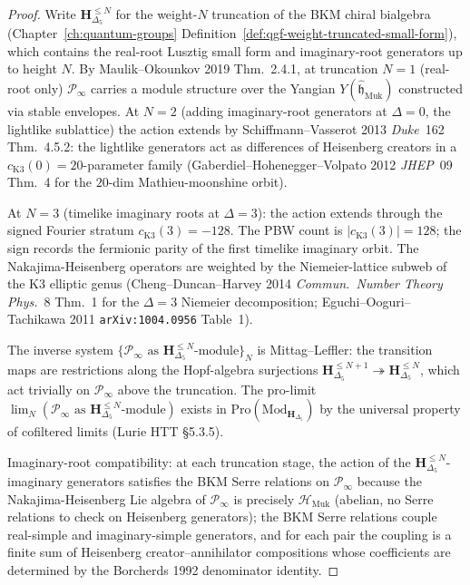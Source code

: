 \begin{proof}
Write $\mathbf H_{\Delta_5}^{\leq N}$ for the weight-$N$ truncation
of the BKM chiral bialgebra
(Chapter~\ref{ch:quantum-groups}
Definition~\ref{def:qgf-weight-truncated-small-form}), which
contains the real-root Lusztig small form and imaginary-root
generators up to height $N$. By Maulik--Okounkov 2019 Thm.~2.4.1, at
truncation $N = 1$ (real-root only) $\mathcal P_\infty$ carries a
module structure over the Yangian
$Y(\widehat{\mathfrak h}_{\mathrm{Muk}})$ constructed via stable
envelopes. At $N = 2$ (adding imaginary-root generators at $\Delta = 0$,
the lightlike sublattice) the action extends by
Schiffmann--Vasserot 2013 \emph{Duke}~162 Thm.~4.5.2: the lightlike
generators act as differences of Heisenberg creators in a
$c_{\mathrm{K3}}(0) = 20$-parameter family
(Gaberdiel--Hohenegger--Volpato 2012 \emph{JHEP}~09 Thm.~4 for the
$20$-dim Mathieu-moonshine orbit).

At $N = 3$ (timelike imaginary roots at $\Delta = 3$): the action
extends through the signed Fourier stratum
$c_{\mathrm{K3}}(3)=-128$.  The PBW count is $|c_{\mathrm{K3}}(3)|=128$;
the sign records the fermionic parity of the first timelike imaginary
orbit.  The Nakajima-Heisenberg operators are weighted by the
Niemeier-lattice subweb of the K3 elliptic genus
(Cheng--Duncan--Harvey 2014 \emph{Commun.\ Number Theory Phys.}~8
Thm.~1 for the $\Delta = 3$ Niemeier decomposition; Eguchi--Ooguri--
Tachikawa 2011 \texttt{arXiv:1004.0956} Table~1).

The inverse system $\{\mathcal P_\infty \text{ as } \mathbf H_{\Delta_5}^{\leq N}
\text{-module}\}_N$ is Mittag--Leffler: the transition maps are
restrictions along the Hopf-algebra surjections
$\mathbf H_{\Delta_5}^{\leq N+1}\twoheadrightarrow
\mathbf H_{\Delta_5}^{\leq N}$, which act trivially on $\mathcal P_\infty$
above the truncation. The pro-limit
$\lim_N(\mathcal P_\infty\text{ as }\mathbf H_{\Delta_5}^{\leq N}\text{-module})$
exists in
$\mathrm{Pro}(\mathrm{Mod}_{\mathbf H_{\Delta_5}})$ by the universal
property of cofiltered limits (Lurie HTT \S5.3.5).

Imaginary-root compatibility: at each truncation stage, the action of
the $\mathbf H_{\Delta_5}^{\leq N}$-imaginary generators satisfies the
BKM Serre relations on $\mathcal P_\infty$ because the Nakajima-Heisenberg
Lie algebra of $\mathcal P_\infty$ is precisely $\mathcal H_{\mathrm{Muk}}$
(abelian, no Serre relations to check on Heisenberg generators); the
BKM Serre relations couple real-simple and imaginary-simple generators,
and for each pair the coupling is a finite sum of Heisenberg
creator--annihilator compositions whose coefficients are determined by
the Borcherds 1992 denominator identity.


\end{proof}
